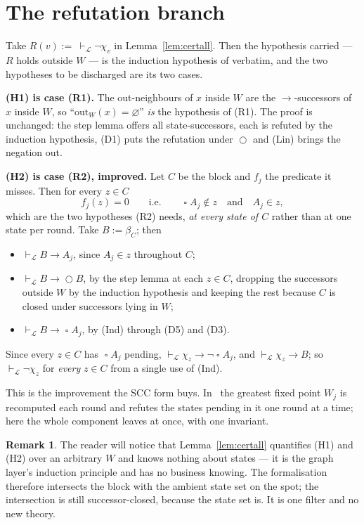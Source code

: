 \documentclass[11pt,a4paper]{article}
\theoremstyle{definition}
\newtheorem{remark}[theorem]{Remark}
\newcommand{\Next}{\mathop{\bigcirc}}
\newcommand{\Always}{\mathop{\square}}
\newcommand{\proves}{\vdash_{\mathcal{L}}}
\newcommand{\outs}{\mathrm{out}}
\begin{document}
\section{The refutation branch}\label{sec:extract}

Take $R(v):=\ \proves\neg\chi_v$ in Lemma~\ref{lem:certall}.  Then the
hypothesis carried --- $R$ holds outside $W$ --- is the induction hypothesis of
\cite[Thm.~4.1]{m4} verbatim, and the two hypotheses to be discharged are its
two cases.

\medskip\noindent\textbf{(H1) is case (R1).}
The out-neighbours of $x$ inside $W$ are the $\to$-successors of $x$ inside
$W$, so ``$\outs_W(x)=\varnothing$'' \emph{is} the hypothesis of (R1).  The
proof is~\cite[Thm.~4.1, case (R1)]{m4} unchanged: the step lemma offers all
state-successors, each is refuted by the induction hypothesis, (D1) puts the
refutation under $\Next$ and (Lin) brings the negation out.

\medskip\noindent\textbf{(H2) is case (R2), improved.}
Let $C$ be the block and $f_j$ the predicate it misses.  Then for every $z\in C$
\[
  f_j(z)=0
  \qquad\text{i.e.}\qquad
  \Always A_j\notin z \quad\text{and}\quad A_j\in z ,
\]
which are the two hypotheses (R2) needs, \emph{at every state of $C$} rather
than at one state per round.  Take $B:=\beta_C$; then
\begin{itemize}
\item[(i)] $\proves B\to A_j$, since $A_j\in z$ throughout $C$;
\item[(ii)] $\proves B\to\Next B$, by the step lemma at each $z\in C$, dropping
  the successors outside $W$ by the induction hypothesis and keeping the rest
  because $C$ is closed under successors lying in $W$;
\item[(iii)] $\proves B\to\Always A_j$, by (Ind) through (D5) and (D3).
\end{itemize}
Since every $z\in C$ has $\Always A_j$ pending, $\proves\chi_z\to\neg\Always
A_j$, and $\proves\chi_z\to B$; so $\proves\neg\chi_z$ for \emph{every} $z\in C$
from a single use of (Ind).
\medskip

This is the improvement the SCC form buys.  In~\cite{m4} the greatest fixed
point $W_j$ is recomputed each round and refutes the states pending in it one
round at a time; here the whole component leaves at once, with one invariant.

\begin{remark}
The reader will notice that Lemma~\ref{lem:certall} quantifies (H1) and (H2)
over an arbitrary $W$ and knows nothing about states --- it is the graph
layer's induction principle and has no business knowing.  The formalisation
therefore intersects the block with the ambient state set on the spot; the
intersection is still successor-closed, because the state set is.  It is one
filter and no new theory.
\end{remark}
\end{document}
